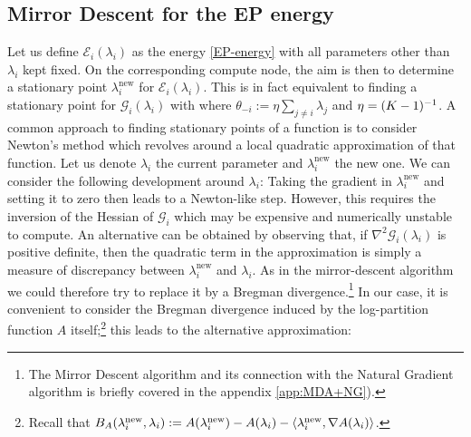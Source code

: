 \subsection{\label{point:MD-for-EP}Mirror Descent for the EP energy}
Let us define $\mathcal E_i(\lambda_i)$ as the energy \eqref{EP-energy} with all parameters other than $\lambda_i$ kept fixed. On the corresponding compute node, the aim is then to determine a stationary point $\lambda_i^{\text{new}}$ for $\mathcal E_i(\lambda_i)$. This is in fact equivalent to finding a stationary point for $\mathcal G_i(\lambda_i)$ with
where $\theta_{-i}:=\eta\sum_{j\neq i}\lambda_j$ and $\eta=(K-1)^{-1}$. A common approach to finding stationary points of a function is to consider Newton's method which revolves around a local quadratic approximation of that function. Let us denote $\lambda_i$ the current parameter and $\lambda_i^{\text{new}}$ the new one. We can consider the following development around $\lambda_i$:
%
%
Taking the gradient in $\lambda_i^{\text{new}}$ and setting it to zero then leads to a Newton-like step. However, this requires the inversion of the Hessian of $\mathcal G_i$ which may be expensive and numerically unstable to compute. An alternative can be obtained by observing that, if $\nabla^{2}\mathcal G_i(\lambda_i)$ is positive definite, then the quadratic term in the approximation is simply a measure of discrepancy between $\lambda_i^{\text{new}}$ and $\lambda_i$. As in the mirror-descent algorithm \citep{nemirovski83, beck03} we could therefore try to replace it by a Bregman divergence.\footnote{The Mirror Descent algorithm and its connection with the Natural Gradient algorithm is briefly covered in the appendix \ref{app:MDA+NG}).} 
In our case, it is convenient to consider the Bregman divergence induced by the log-partition function $A$ itself;\footnote{Recall that $B_A(\lambda_i^{\text{new}},\lambda_i):=A(\lambda_i^{\text{new}})-A(\lambda_i)-\left\langle \lambda_i^{\text{new}},\nabla A(\lambda_i) \right\rangle$.} this leads to the alternative approximation:
